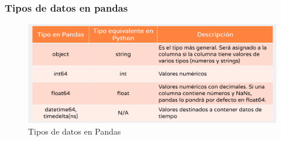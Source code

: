 \documentclass{article}
\begin{document}
\subsubsection{Tipos de datos en pandas}
\begin{figure}[H]
    \centering
    \includegraphics[width=1\linewidth]{TiposDatosPandas.png}
    \caption{Tipos de datos en Pandas}
    \label{fig:enter-label}
\end{figure}
\end{document}
